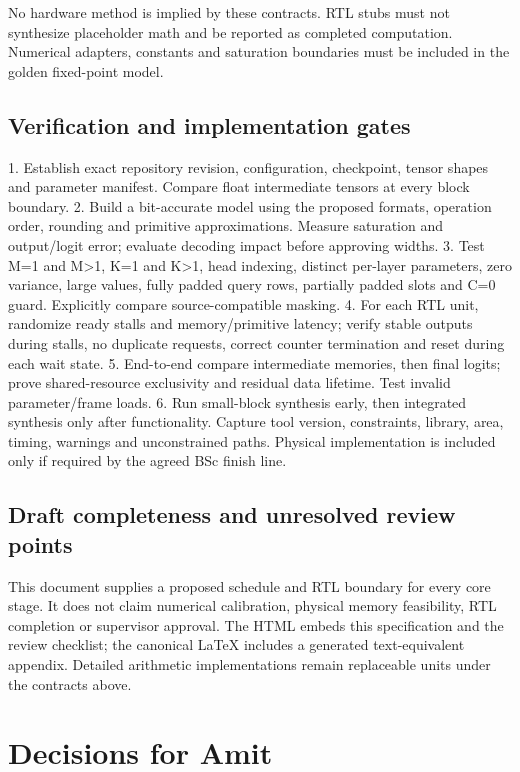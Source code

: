\documentclass[11pt,a4paper]{article}
\begin{document}
No hardware method is implied by these contracts. RTL stubs must not synthesize placeholder math and be reported as completed computation. Numerical adapters, constants and saturation boundaries must be included in the golden fixed-point model.

\subsection{Verification and implementation gates}

1. Establish exact repository revision, configuration, checkpoint, tensor shapes and parameter manifest. Compare float intermediate tensors at every block boundary.
2. Build a bit-accurate model using the proposed formats, operation order, rounding and primitive approximations. Measure saturation and output/logit error; evaluate decoding impact before approving widths.
3. Test M=1 and M>1, K=1 and K>1, head indexing, distinct per-layer parameters, zero variance, large values, fully padded query rows, partially padded slots and C=0 guard. Explicitly compare source-compatible masking.
4. For each RTL unit, randomize ready stalls and memory/primitive latency; verify stable outputs during stalls, no duplicate requests, correct counter termination and reset during each wait state.
5. End-to-end compare intermediate memories, then final logits; prove shared-resource exclusivity and residual data lifetime. Test invalid parameter/frame loads.
6. Run small-block synthesis early, then integrated synthesis only after functionality. Capture tool version, constraints, library, area, timing, warnings and unconstrained paths. Physical implementation is included only if required by the agreed BSc finish line.

\subsection{Draft completeness and unresolved review points}

This document supplies a proposed schedule and RTL boundary for every core stage. It does not claim numerical calibration, physical memory feasibility, RTL completion or supervisor approval. The HTML embeds this specification and the review checklist; the canonical LaTeX includes a generated text-equivalent appendix. Detailed arithmetic implementations remain replaceable units under the contracts above.


\section{Decisions for Amit}
\end{document}
